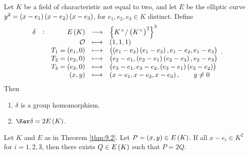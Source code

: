 \begin{theorem}
\label{thm:9.2}
Let $ K $ be a field of characteristic not equal to two, and let $ E $ be the elliptic curve $ y^2 = \br{x - e_1}\br{x - e_2}\br{x - e_3} $, for $ e_1, e_2, e_3 \in K $ distinct. Define
$$
\begin{array}{ccrcl}
\delta & : & E\br{K} & \longrightarrow & \cbr{K^\times / \br{K^\times}^2}^3 \\
& & \OOO & \longmapsto & \br{1, 1, 1} \\
& & T_1 = \br{e_1, 0} & \longmapsto & \br{\br{e_1 - e_2}\br{e_1 - e_3}, e_1 - e_2, e_1 - e_3} \\
& & T_2 = \br{e_2, 0} & \longmapsto & \br{e_2 - e_1, \br{e_2 - e_1}\br{e_2 - e_3}, e_2 - e_3} \\
& & T_3 = \br{e_3, 0} & \longmapsto & \br{e_3 - e_1, e_3 - e_2, \br{e_3 - e_1}\br{e_3 - e_2}} \\
& & \br{x, y} & \longmapsto & \br{x - e_1, x - e_2, x - e_3}, \qquad y \ne 0
\end{array}.
$$
Then
\begin{enumerate}
\item $ \delta $ is a group homomorphism.
\item $ \Ker \delta = 2E\br{K} $.
\end{enumerate}
\end{theorem}

\begin{lemma}
\label{lem:9.3}
Let $ K $ and $ E $ as in Theorem \ref{thm:9.2}. Let $ P = \br{x, y} \in E\br{K} $. If all $ x - e_i \in K^2 $ for $ i = 1, 2, 3 $, then there exists $ Q \in E\br{K} $ such that $ P = 2Q $.
\end{lemma}

